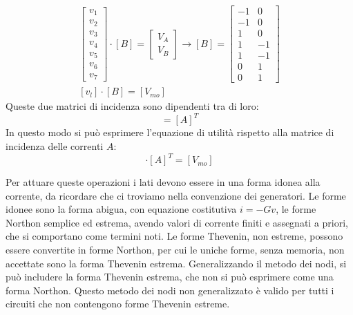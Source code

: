 \documentclass{article}
\numberwithin{equation}{subsection}
\begin{document}
\begin{gather*}
    \begin{bmatrix}
        v_1\\
        v_2\\
        v_3\\
        v_4\\
        v_5\\
        v_6\\
        v_7
    \end{bmatrix}\cdot[B]=\begin{bmatrix}
        V_A\\
        V_B
    \end{bmatrix}\to[B]=\begin{bmatrix}
        -1&0\\
        -1&0\\
        1&0\\
        1&-1\\
        1&-1\\
        0&1\\
        0&1
    \end{bmatrix}\\
    [v_l]\cdot[B]=[V_{mo}]
\end{gather*}
Queste due matrici di incidenza sono dipendenti tra di loro:
\begin{equation*}
    [B]=[A]^T
\end{equation*}
In questo modo si può esprimere l'equazione di utilità rispetto alla matrice di incidenza delle correnti $A$:
\begin{equation*}
    [v_l]\cdot[A]^T=[V_{mo}]
\end{equation*}

Per attuare queste operazioni i lati devono essere in una forma idonea alla corrente, da ricordare che ci troviamo nella convenzione dei generatori. 
Le forme idonee sono la forma abigua, con equazione costitutiva $i=-Gv$, le forme Northon semplice ed estrema, avendo valori di corrente finiti e assegnati a priori, che si 
comportano come termini noti. Le forme Thevenin, non estreme, possono essere convertite in forme Northon, per cui le uniche forme, senza memoria, non accettate sono 
la forma Thevenin estrema. Generalizzando il metodo dei nodi, si può includere la forma Thevenin estrema, che non si può esprimere come una forma Northon. 
Questo metodo dei nodi non generalizzato è valido per tutti i circuiti che non contengono forme Thevenin estreme. 
\end{document}
